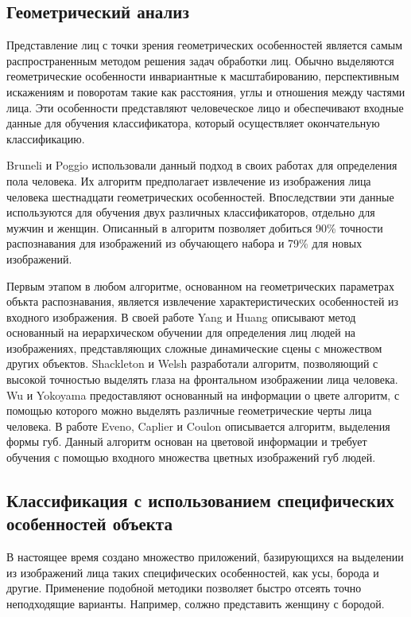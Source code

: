 \subsection{Геометрический анализ}
Представление лиц  с точки зрения геометрических особенностей является самым
распространенным методом решения задач обработки лиц. Обычно выделяются
геометрические особенности инвариантные к  масштабированию, перспективным
искажениям и поворотам такие как расстояния, углы и отношения между частями
лица. Эти особенности представляют человеческое лицо и обеспечивают входные
данные для обучения классификатора, который осуществляет окончательную
классификацию.

Bruneli и Poggio \cite{Bruneli_Poggio} использовали данный подход в своих
работах для определения пола человека. Их алгоритм предполагает извлечение из
изображения лица человека шестнадцати геометрических особенностей. Впоследствии
эти данные используются для обучения двух различных классификаторов, отдельно
для мужчин и женщин. Описанный в \cite{Bruneli_Poggio} алгоритм позволяет
добиться 90\% точности распознавания для изображений из обучающего набора и 79\%
для новых изображений.

Первым этапом в любом алгоритме, основанном на геометрических параметрах объкта
распознавания, является извлечение характеристических особенностей из входного
изображения. В своей работе \cite{Yang_Huang} Yang и Huang описывают метод
основанный на иерархическом обучении для определения лиц людей на изображениях,
представляющих сложные динамические сцены с множеством других объектов.
Shackleton и Welsh \cite{Shackleton_Welsh} разработали алгоритм, позволяющий с
высокой точностью выделять глаза на фронтальном изображении лица человека. Wu и
Yokoyama \cite{Wu_Yokoyama} предоставляют основанный на информации о цвете
алгоритм, с помощью которого можно выделять различные геометрические черты лица
человека. В работе Eveno, Caplier и Coulon \cite{Eveno_Caplier_Coulon}
описывается алгоритм, выделения формы губ. Данный алгоритм основан на цветовой
информации и требует обучения с помощью входного множества цветных изображений
губ людей.


\subsection{Классификация с использованием специфических особенностей объекта}

В настоящее время создано множество приложений, базирующихся на выделении из
изображений лица таких специфических особенностей, как усы, борода и другие.
Применение подобной методики позволяет быстро отсеять точно неподходящие
варианты. Например, солжно представить женщину с бородой.

